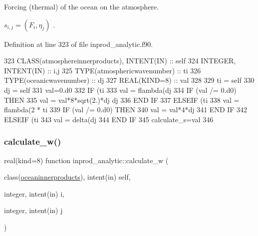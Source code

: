 Forcing (thermal) of the ocean on the atmosphere. 

$ s_{i,j} = (F_i, \eta_j)$ . 

Definition at line 323 of file inprod\+\_\+analytic.\+f90.


\begin{DoxyCode}
323     \textcolor{keywordtype}{CLASS}(atmosphereinnerproducts), \textcolor{keywordtype}{INTENT(IN)} :: self
324     \textcolor{keywordtype}{INTEGER}, \textcolor{keywordtype}{INTENT(IN)} :: i,j
325     \textcolor{keywordtype}{TYPE}(atmosphericwavenumber) :: ti
326     \textcolor{keywordtype}{TYPE}(oceanicwavenumber) :: dj
327     \textcolor{keywordtype}{REAL(KIND=8)} :: val
328     
329     ti = self%
330     dj = self%
331     val=0.d0
332     \textcolor{keywordflow}{IF} (ti%
333       val = flambda(dj%
334       \textcolor{keywordflow}{IF} (val /= 0.d0) \textcolor{keywordflow}{THEN}
335         val = val*8*sqrt(2.)*dj%
      dj%
336 \textcolor{keywordflow}{      END IF}
337     \textcolor{keywordflow}{ELSEIF} (ti%
338       val = flambda(2 * ti%
339       \textcolor{keywordflow}{IF} (val /= 0.d0) \textcolor{keywordflow}{THEN}
340         val = val*4*dj%
341 \textcolor{keywordflow}{      END IF}
342     \textcolor{keywordflow}{ELSEIF} (ti%
343       val = delta(dj%
344 \textcolor{keywordflow}{    END IF}
345     calculate\_s=val
346     
\end{DoxyCode}
\mbox{\label{namespaceinprod__analytic_a2d96b61d6e18b90638227c6f82042281}} 
\subsubsection{\texorpdfstring{calculate\+\_\+w()}{calculate\_w()}}
{\footnotesize\ttfamily real(kind=8) function inprod\+\_\+analytic\+::calculate\+\_\+w (\begin{DoxyParamCaption}\item[{class(\hyperlink{structinprod__analytic_1_1oceaninnerproducts}{oceaninnerproducts}), intent(in)}]{self,  }\item[{integer, intent(in)}]{i,  }\item[{integer, intent(in)}]{j }\end{DoxyParamCaption})\hspace{0.3cm}{\ttfamily [private]}}



